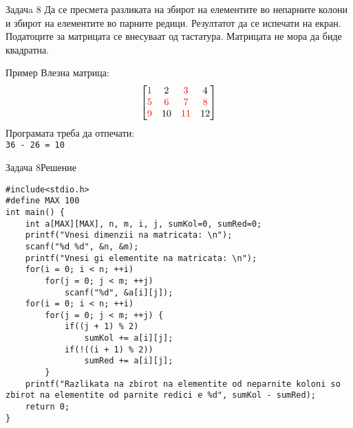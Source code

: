 \begin{frame}{Задачa 8}
Да се пресмета разликата на збирот на елементите во непарните колони и збирот на елементите во парните редици. Резултатот да се испечати на екран. Податоците за матрицата се внесуваат од тастатура. Матрицата не мора да биде квадратна.
\begin{exampleblock}{Пример}
Влезна матрица:\\
$$\begin{bmatrix}
{\color{red}1} & {2} & {\color{red}3} & {4} \\ 
{\color{red}5} & {\color{red}6} & {\color{red}7} & {\color{red}8} \\ 
{\color{red}9} & {10} & {\color{red}11} & {12} 
\end{bmatrix}$$
Програмата треба да отпечати:\\
\texttt{{\color{red}36} - {\color{blue}26} = 10}
\end{exampleblock}
\end{frame}


\begin{frame}[fragile]{Задача 8}{Решение} 
\begin{lstlisting}
#include<stdio.h>
#define MAX 100
int main() {
    int a[MAX][MAX], n, m, i, j, sumKol=0, sumRed=0;
    printf("Vnesi dimenzii na matricata: \n");
    scanf("%d %d", &n, &m);
    printf("Vnesi gi elementite na matricata: \n");
    for(i = 0; i < n; ++i)
        for(j = 0; j < m; ++j)
            scanf("%d", &a[i][j]);
    for(i = 0; i < n; ++i)
        for(j = 0; j < m; ++j) {
            if((j + 1) % 2)
                sumKol += a[i][j];
            if(!((i + 1) % 2))
                sumRed += a[i][j];
        }
    printf("Razlikata na zbirot na elementite od neparnite koloni so zbirot na elementite od parnite redici e %d", sumKol - sumRed);
    return 0;
}
\end{lstlisting}
\end{frame}

